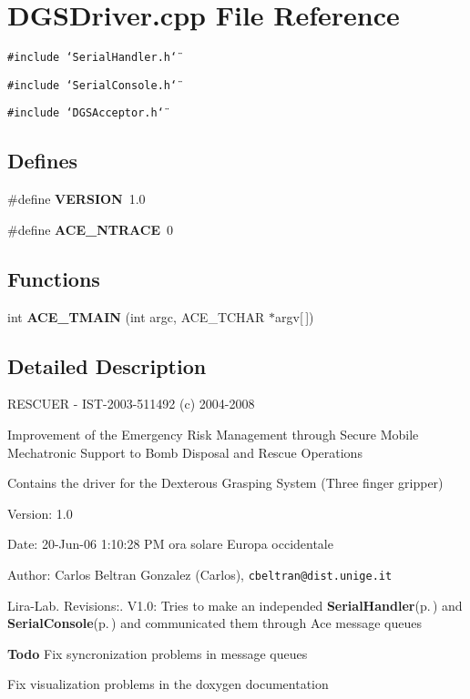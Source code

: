 \section{DGSDriver.cpp File Reference}
\label{DGSDriver_8cpp}
{\tt \#include \char`\"{}Serial\-Handler.h\char`\"{}}\par
{\tt \#include \char`\"{}Serial\-Console.h\char`\"{}}\par
{\tt \#include \char`\"{}DGSAcceptor.h\char`\"{}}\par
\subsection*{Defines}
\begin{CompactItemize}
\item 
\#define {\bf VERSION}\ 1.0
\item 
\#define {\bf ACE\_\-NTRACE}\ 0
\end{CompactItemize}
\subsection*{Functions}
\begin{CompactItemize}
\item 
int {\bf ACE\_\-TMAIN} (int argc, ACE\_\-TCHAR $\ast$argv[$\,$])
\end{CompactItemize}


\subsection{Detailed Description}
RESCUER - IST-2003-511492 (c) 2004-2008

Improvement of the Emergency Risk Management through Secure Mobile Mechatronic Support to Bomb Disposal and Rescue Operations

Contains the driver for the Dexterous Grasping System (Three finger gripper) \begin{Desc}
\item[Version:]1.0 \end{Desc}
\begin{Desc}
\item[Date:]20-Jun-06 1:10:28 PM ora solare Europa occidentale \end{Desc}
\begin{Desc}
\item[Author:]Carlos Beltran Gonzalez (Carlos), {\tt cbeltran@dist.unige.it} 

Lira-Lab. Revisions:. V1.0: Tries to make an independed {\bf Serial\-Handler}{\rm (p.\,\pageref{classSerialHandler})} and {\bf Serial\-Console}{\rm (p.\,\pageref{classSerialConsole})} and communicated them through Ace message queues \end{Desc}
\begin{Desc}
\item[{\bf Todo}]Fix syncronization problems in message queues 

Fix visualization problems in the doxygen documentation \end{Desc}


